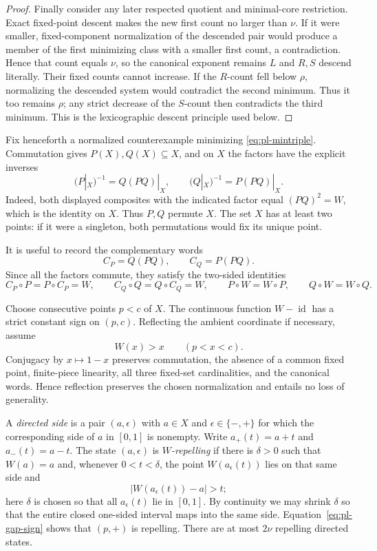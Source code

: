 \documentclass[11pt]{article}
\theoremstyle{definition}
\theoremstyle{remark}
\newcommand{\I}{[0,1]}
\newcommand{\id}{\operatorname{id}}
\begin{document}
\begin{proof}
Finally consider any later respected quotient and minimal-core restriction.
Exact fixed-point descent makes the new first count no larger than \(\nu\).
If it were smaller, fixed-component normalization of the descended pair
would produce a member of the first minimizing class with a smaller first
count, a contradiction.  Hence that count equals \(\nu\), so the canonical
exponent remains \(L\) and \(R,S\) descend literally.  Their fixed counts
cannot increase.  If the \(R\)-count fell below \(\rho\), normalizing the
descended system would contradict the second minimum.  Thus it too remains
\(\rho\); any strict decrease of the \(S\)-count then contradicts the third
minimum.  This is the lexicographic descent principle used below.
\end{proof}

Fix henceforth a normalized counterexample minimizing
\eqref{eq:pl-mintriple}.  Commutation gives \(P(X),Q(X)\subseteq X\), and on
\(X\) the factors have the explicit inverses
\begin{equation}\label{eq:pl-X-inverses}
 (P|_X)^{-1}=Q(PQ)|_X,\qquad
 (Q|_X)^{-1}=P(PQ)|_X.
\end{equation}
Indeed, both displayed composites with the indicated factor equal
\((PQ)^2=W\), which is the identity on \(X\).  Thus \(P,Q\) permute \(X\).
The set \(X\) has at least two points: if it were a singleton, both
permutations would fix its unique point.

It is useful to record the complementary words
\[
 C_P=Q(PQ),\qquad C_Q=P(PQ).
\]
Since all the factors commute, they satisfy the two-sided identities
\begin{equation}\label{eq:pl-complementary-identities}
 C_P\circ P=P\circ C_P=W,\qquad
 C_Q\circ Q=Q\circ C_Q=W,\qquad
 P\circ W=W\circ P,\qquad Q\circ W=W\circ Q.
\end{equation}

Choose consecutive points \(p<c\) of \(X\).  The continuous function
\(W-\id\) has a strict constant sign on \((p,c)\).  Reflecting the ambient
coordinate if necessary, assume
\begin{equation}\label{eq:pl-gap-sign}
 W(x)>x\qquad(p<x<c).
\end{equation}
Conjugacy by \(x\mapsto1-x\) preserves commutation, the absence of a common
fixed point, finite-piece linearity, all three fixed-set cardinalities, and
the canonical words.  Hence reflection preserves the chosen normalization
and entails no loss of generality.

A \emph{directed side} is a pair $(a,\epsilon)$ with $a\in X$ and
$\epsilon\in\{-,+\}$ for which the corresponding side of $a$ in $\I$ is
nonempty.  Write $a_+(t)=a+t$ and $a_-(t)=a-t$.  The state
$(a,\epsilon)$ is \emph{$W$-repelling} if there is $\delta>0$ such that
$W(a)=a$ and, whenever $0<t<\delta$, the point
$W(a_\epsilon(t))$ lies on that same side and
\[
 |W(a_\epsilon(t))-a|>t;
\]
here $\delta$ is chosen so that all $a_\epsilon(t)$ lie in $\I$.  By
continuity we may shrink $\delta$ so that the entire closed one-sided
interval maps into the same side.  Equation~\eqref{eq:pl-gap-sign} shows
that $(p,+)$ is repelling.
There are at most $2\nu$ repelling directed states.
\end{document}
